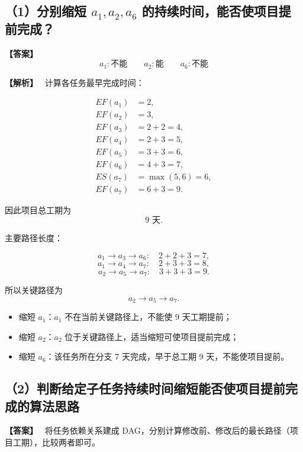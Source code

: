 \documentclass[12pt,a4paper]{ctexart}
\newenvironment{solution}
{\par\noindent\textbf{\color{answerblue}【解析】}\ }
{\par}
\newenvironment{answer}
{\par\noindent\textbf{\color{darkgreen}【答案】}\ }
{\par}
\begin{document}
\subsection*{（1）分别缩短 $a_1,a_2,a_6$ 的持续时间，能否使项目提前完成？}

\begin{answer}
\[
\boxed{a_1:\text{不能}\qquad a_2:\text{能}\qquad a_6:\text{不能}}
\]
\end{answer}

\begin{solution}
计算各任务最早完成时间：

\[
\begin{aligned}
EF(a_1)&=2,\\
EF(a_2)&=3,\\
EF(a_3)&=2+2=4,\\
EF(a_4)&=2+3=5,\\
EF(a_5)&=3+3=6,\\
EF(a_6)&=4+3=7,\\
ES(a_7)&=\max(5,6)=6,\\
EF(a_7)&=6+3=9.
\end{aligned}
\]

因此项目总工期为
\[
\boxed{9\text{ 天}}.
\]

主要路径长度：

\[
a_1\to a_3\to a_6:\quad 2+2+3=7,
\]
\[
a_1\to a_4\to a_7:\quad 2+3+3=8,
\]
\[
a_2\to a_5\to a_7:\quad 3+3+3=9.
\]

所以关键路径为
\[
\boxed{a_2\to a_5\to a_7}.
\]

\begin{itemize}
  \item 缩短 $a_1$：$a_1$ 不在当前关键路径上，不能使 9 天工期提前；
  \item 缩短 $a_2$：$a_2$ 位于关键路径上，适当缩短可使项目提前完成；
  \item 缩短 $a_6$：该任务所在分支 7 天完成，早于总工期 9 天，不能使项目提前。
\end{itemize}
\end{solution}

\subsection*{（2）判断给定子任务持续时间缩短能否使项目提前完成的算法思路}

\begin{answer}
将任务依赖关系建成 DAG，分别计算修改前、修改后的最长路径（项目工期），比较两者即可。
\end{answer}
\end{document}
